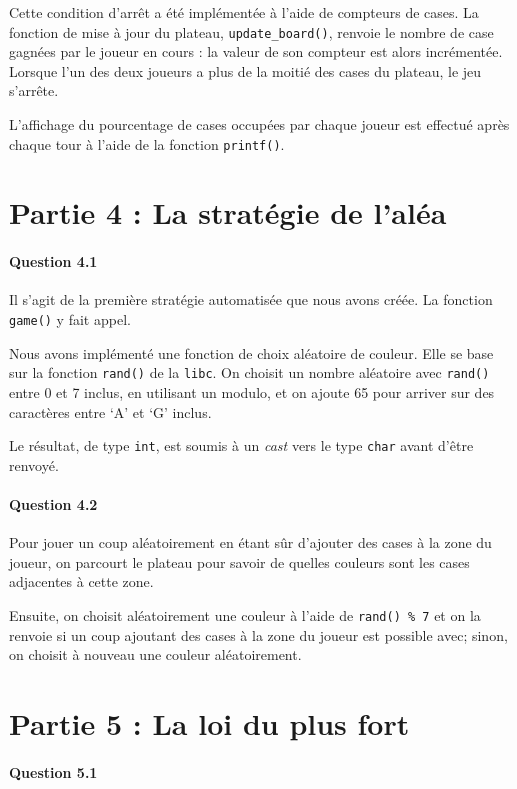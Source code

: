 \documentclass[a4paper]{article}
\begin{document}
Cette condition d'arrêt a été implémentée à l'aide de compteurs de cases. La 
fonction de mise à jour du plateau, \texttt{update\_board()}, renvoie le nombre 
de case gagnées par le joueur en cours : la valeur de son compteur est alors 
incrémentée. Lorsque l'un des deux joueurs a plus de la moitié des cases du 
plateau, le jeu s'arrête.

L'affichage du pourcentage de cases occupées par chaque joueur est effectué 
après chaque tour à l'aide de la fonction \texttt{printf()}.
    \section{Partie 4 : La stratégie de l'aléa}
    \paragraph{Question 4.1} 
Il s'agit de la première stratégie automatisée que nous avons créée. La 
fonction \texttt{game()} y fait appel.

Nous avons implémenté une fonction de choix aléatoire de couleur. Elle se 
base sur la fonction \texttt{rand()} de la \texttt{libc}. On choisit un nombre 
aléatoire avec \texttt{rand()} entre 0 et 7 inclus, en utilisant un modulo, et 
on ajoute 65 pour arriver sur des caractères entre `A' et `G' inclus. 

Le résultat, de type \texttt{int}, est soumis à un \emph{cast} vers le type 
\texttt{char} avant d'être renvoyé.

    \paragraph{Question 4.2} 
    Pour jouer un coup aléatoirement en étant sûr d'ajouter des cases à la 
zone du joueur, on parcourt le plateau pour savoir de quelles couleurs sont les 
cases adjacentes à cette zone. 

Ensuite, on choisit aléatoirement une couleur à l'aide de \texttt{rand() \% 
7} et on la renvoie si un coup ajoutant des cases à la zone du joueur est 
possible avec; sinon, on choisit à nouveau une couleur aléatoirement.

    \section{Partie 5 : La loi du plus fort}
    \paragraph{Question 5.1}
    
\end{document}
